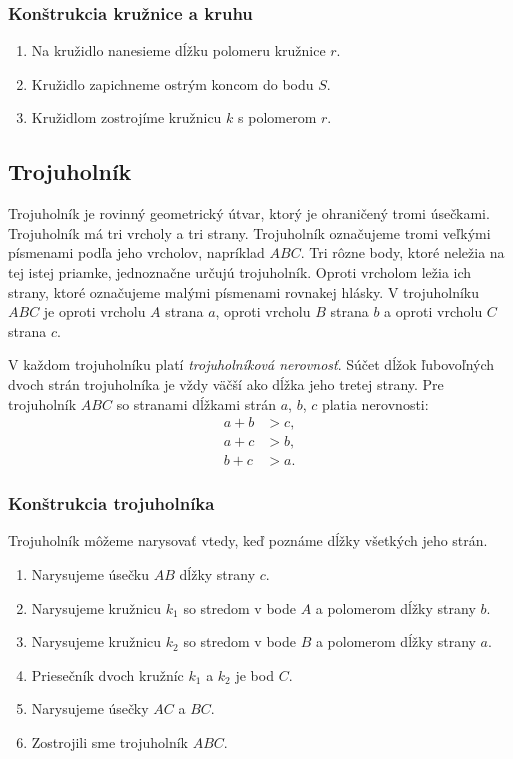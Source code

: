 \documentclass{report}
\begin{document}
\subsubsection{Konštrukcia kružnice a kruhu}

\begin{enumerate}[label=\arabic*)]
  \item Na kružidlo nanesieme dĺžku polomeru kružnice \(r\).
  \item Kružidlo zapichneme ostrým koncom do bodu \(S\).
  \item Kružidlom zostrojíme kružnicu \(k\) s polomerom \(r\).
\end{enumerate}

\subsection{Trojuholník}

Trojuholník je rovinný geometrický útvar, ktorý je ohraničený tromi úsečkami. Trojuholník má tri vrcholy a tri strany. Trojuholník označujeme tromi veľkými písmenami podľa jeho vrcholov, napríklad \(ABC\). Tri rôzne body, ktoré neležia na tej istej priamke, jednoznačne určujú trojuholník. Oproti vrcholom ležia ich strany, ktoré označujeme malými písmenami rovnakej hlásky. V trojuholníku \(ABC\) je oproti vrcholu \(A\) strana \(a\), oproti vrcholu \(B\) strana \(b\) a oproti vrcholu \(C\) strana \(c\).

V každom trojuholníku platí \emph{trojuholníková nerovnosť}. Súčet dĺžok ľubovoľných dvoch strán trojuholníka je vždy väčší ako dĺžka jeho tretej strany. Pre trojuholník \(ABC\) so stranami dĺžkami strán \(a\), \(b\), \(c\) platia nerovnosti:
\[
\begin{aligned}
  a + b &> c, \\
  a + c &> b, \\
  b + c &> a.
\end{aligned}
\]

\subsubsection{Konštrukcia trojuholníka}

Trojuholník môžeme narysovať vtedy, keď poznáme dĺžky všetkých jeho strán.

\begin{enumerate}[label=\arabic*)]
  \item Narysujeme úsečku \(AB\) dĺžky strany \(c\).
  \item Narysujeme kružnicu \(k_1\) so stredom v bode \(A\) a polomerom dĺžky strany \(b\).
  \item Narysujeme kružnicu \(k_2\) so stredom v bode \(B\) a polomerom dĺžky strany \(a\).
  \item Priesečník dvoch kružníc \(k_1\) a \(k_2\) je bod \(C\).
  \item Narysujeme úsečky \(AC\) a \(BC\).
  \item Zostrojili sme trojuholník \(ABC\).
\end{enumerate}
\end{document}
